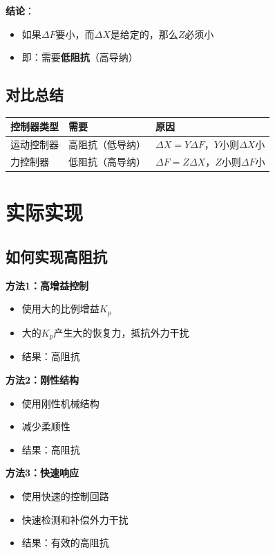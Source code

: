 \documentclass[12pt,a4paper]{article}
\begin{document}
\textbf{结论}：
\begin{itemize}
\item 如果$\Delta F$要小，而$\Delta X$是给定的，那么$Z$必须小
\item 即：需要\textbf{低阻抗}（高导纳）
\end{itemize}

\subsection{对比总结}

\begin{center}
\begin{tabular}{|l|l|l|}
\hline
\textbf{控制器类型} & \textbf{需要} & \textbf{原因} \\
\hline
运动控制器 & 高阻抗（低导纳） & $\Delta X = Y \Delta F$，$Y$小则$\Delta X$小 \\
\hline
力控制器 & 低阻抗（高导纳） & $\Delta F = Z \Delta X$，$Z$小则$\Delta F$小 \\
\hline
\end{tabular}
\end{center}

\section{实际实现}

\subsection{如何实现高阻抗}

\textbf{方法1：高增益控制}
\begin{itemize}
\item 使用大的比例增益$K_p$
\item 大的$K_p$产生大的恢复力，抵抗外力干扰
\item 结果：高阻抗
\end{itemize}

\textbf{方法2：刚性结构}
\begin{itemize}
\item 使用刚性机械结构
\item 减少柔顺性
\item 结果：高阻抗
\end{itemize}

\textbf{方法3：快速响应}
\begin{itemize}
\item 使用快速的控制回路
\item 快速检测和补偿外力干扰
\item 结果：有效的高阻抗
\end{itemize}
\end{document}
